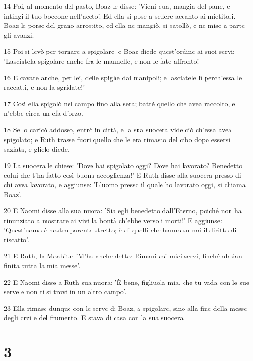\par 14 Poi, al momento del pasto, Boaz le disse: 'Vieni qua, mangia del pane, e intingi il tuo boccone nell'aceto'. Ed ella si pose a sedere accanto ai mietitori. Boaz le porse del grano arrostito, ed ella ne mangiò, si satollò, e ne mise a parte gli avanzi.
\par 15 Poi si levò per tornare a spigolare, e Boaz diede quest'ordine ai suoi servi: 'Lasciatela spigolare anche fra le mannelle, e non le fate affronto!
\par 16 E cavate anche, per lei, delle spighe dai manipoli; e lasciatele lì perch'essa le raccatti, e non la sgridate!'
\par 17 Così ella spigolò nel campo fino alla sera; batté quello che avea raccolto, e n'ebbe circa un efa d'orzo.
\par 18 Se lo caricò addosso, entrò in città, e la sua suocera vide ciò ch'essa avea spigolato; e Ruth trasse fuori quello che le era rimasto del cibo dopo essersi saziata, e glielo diede.
\par 19 La suocera le chiese: 'Dove hai spigolato oggi? Dove hai lavorato? Benedetto colui che t'ha fatto così buona accoglienza!' E Ruth disse alla suocera presso di chi avea lavorato, e aggiunse: 'L'uomo presso il quale ho lavorato oggi, si chiama Boaz'.
\par 20 E Naomi disse alla sua nuora: 'Sia egli benedetto dall'Eterno, poiché non ha rinunziato a mostrare ai vivi la bontà ch'ebbe verso i morti!' E aggiunse: 'Quest'uomo è nostro parente stretto; è di quelli che hanno su noi il diritto di riscatto'.
\par 21 E Ruth, la Moabita: 'M'ha anche detto: Rimani coi miei servi, finché abbian finita tutta la mia messe'.
\par 22 E Naomi disse a Ruth sua nuora: 'È bene, figliuola mia, che tu vada con le sue serve e non ti si trovi in un altro campo'.
\par 23 Ella rimase dunque con le serve di Boaz, a spigolare, sino alla fine della messe degli orzi e del frumento. E stava di casa con la sua suocera.

\chapter{3}

